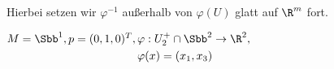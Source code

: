 \begin{rem*}	
	Hierbei setzen wir $ \varphi^{-1} $ außerhalb von $ \varphi(U) $ glatt auf $\R^m$ fort.
\end{rem*}

\begin{exmp*}
	\begin{minipage}{\linewidth}
		\begin{wrapfigure}{R}{0.3\textwidth}
		\end{wrapfigure}
		$ M = \Sbb^1, p = (0,1,0)^T, \begin{aligned}[t]
			&\varphi: U_2^+ \cap \Sbb^2 \to \R^2, \\&\varphi(x) = (x_1,x_3)
		\end{aligned} $
	\end{minipage}
		

\end{exmp*}

